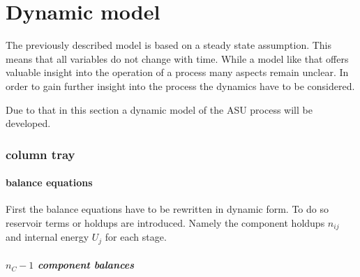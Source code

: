 \chapter{Dynamic model}
    
    The previously described model is based on a steady state assumption. This means that all variables do not 
    change with time. While a model like that offers valuable insight into the operation of a process many 
    aspects remain unclear. In order to gain further insight into the process the dynamics have to be considered. 
    
    Due to that in this section a dynamic model of the ASU process will be developed.   
    
\subsection{column tray}
    \begin{figure}
        
    \end{figure}

\subsubsection{balance equations}
    First the balance equations have to be rewritten in dynamic form. To do so reservoir terms or holdups 
    are introduced. Namely the component holdups $n_{ij}$ and internal energy $U_j$ for each stage. 

    \paragraph{$n_C - 1$ component balances}

